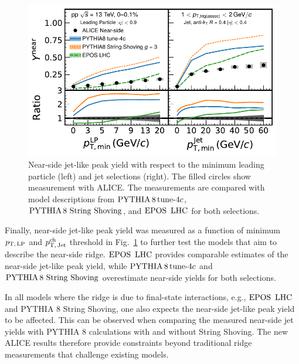 \begin{figure}[h!]
	\centering
	\includegraphics[width=0.89\linewidth]{./figures/Fig9_JetYieldESE.pdf}
	\caption{ Near-side jet-like peak yield with respect to the minimum leading particle (left) and jet selections (right). The filled circles show measurement with ALICE. The measurements are compared with model descriptions from $\mathrm{PYTHIA}\,8\,\mathrm{tune}{\text -}4c$, ${\mathrm{PYTHIA}\,8~\mathrm{String}~}\mathrm{Shoving}$, and ${\mathrm{EPOS}\,~\mathrm{LHC}}$ for both selections.}
	\label{fig:JetYield_ESE}
\end{figure}

Finally, near-side jet-like peak yield was measured as a function of minimum $p_\mathrm{T,\,LP}$ and $p_\mathrm{T,\,Jet}^\mathrm{ch}$ threshold in Fig.~\ref{fig:JetYield_ESE} to further test the models that aim to describe the near-side ridge.
${\mathrm{EPOS}\,~\mathrm{LHC}}$ provides comparable estimates of the near-side jet-like peak yield, while $\mathrm{PYTHIA}\,8\,\mathrm{tune}{\text -}4c$ and ${\mathrm{PYTHIA}\,8~\mathrm{String}~}\mathrm{Shoving}$ overestimate near-side yields for both selections.

In all models where the ridge is due to final-state interactions, e.g., ${\mathrm{EPOS}\,~\mathrm{LHC}}$ and PYTHIA 8 String Shoving, one also expects the near-side jet-like peak yield to be affected. This can be observed when comparing the measured near-side jet yields with PYTHIA 8 calculations with and without String Shoving. The new ALICE results therefore provide constraints beyond traditional ridge measurements that challenge existing models.